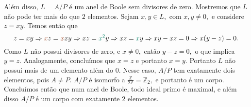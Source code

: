 \documentclass[11pt,a4paper]{article}
\begin{document}
{{Além disso, $L = A/P$ é um anel de Boole sem divisores de zero. Mostremos que $L$ não pode ter mais do que $2$ elementos. Sejam $x, y \in L,$ com $x, y \neq 0,$ e considere $z = xy.$ Temos então que
\[
z = xy \Rightarrow \textcolor{RawSienna}{x}z = \textcolor{RawSienna}{x} xy \Rightarrow xz = \textcolor{PineGreen}{x^2}y \Rightarrow  xz = \textcolor{PineGreen}{x}y \Rightarrow xy - xz = 0 \Rightarrow x(y-z) = 0.
\]
Como $L$ não possui divisores de zero, e $x \neq 0,$ então $y - z = 0,$ o que implica $y = z.$ Analogamente, concluímos que $x = z$ e portanto $x = y.$ Portanto $L$ não possui mais de um elemento além do $0.$ Nesse caso, $A/P$ tem exatamente dois elementos, pois $A \neq P.$ $A/P$ é isomorfo a $\frac{\mathbb{Z}}{2 \mathbb{Z}} = \mathbb{Z}_2,$ e portanto é um corpo. %
Concluímos então que num anel de Boole, todo ideal primo é maximal, e além disso $A/P$ é um corpo com exatamente 2 elementos.
}
}
\end{document}
